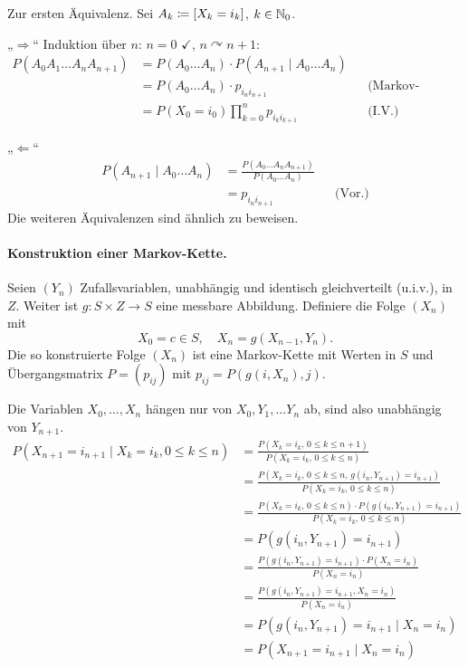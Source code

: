 \documentclass[a4paper,twoside,DIV15,BCOR12mm]{scrbook}
\begin{document}
\begin{beweis}
Zur ersten Äquivalenz. Sei $A_k \da [X_k=i_k]$, $k\in\mathbb{N}_0$.

„$\Longrightarrow$“ Induktion über $n$: $n=0$ $\checkmark$, $n\curvearrowright n+1:$ 
\begin{align*}
P(A_0A_1\ldots A_nA_{n+1}) &= P(A_0\ldots A_n)\cdot P(A_{n+1}\mid A_0\ldots A_n) \\
&= P(A_0\ldots A_n)\cdot p_{i_ni_{n+1}} && \text{(Markov-Eigenschaft)}\\
&= P(X_0=i_0)\prod_{k=0}^n p_{i_ki_{k+1}} && \text{(I.V.)}
\end{align*}

„$\Longleftarrow$“ 
\begin{align*}
P(A_{n+1}\mid A_0\ldots A_n) &= \frac{P(A_0\ldots A_nA_{n+1})}{P(A_0\ldots A_n)} \\
&= p_{i_ni_{n+1}} && \text{(Vor.)}
\end{align*}
Die weiteren Äquivalenzen sind ähnlich zu beweisen.
\end{beweis}

\paragraph{Konstruktion einer Markov-Kette.} Seien $(Y_n)$ Zufallsvariablen, unabhängig und identisch gleichverteilt (u.i.v.), in $Z$. Weiter ist $g:S\times Z\to S$ eine messbare Abbildung. Definiere die Folge $(X_n)$ mit 
\[X_0=c\in S, \quad X_n = g(X_{n-1},Y_n).\]
Die so konstruierte Folge $(X_n)$ ist eine Markov-Kette mit Werten in $S$ und Übergangsmatrix $P=(p_{ij})$ mit $p_{ij} = P(g(i,X_n),j)$.

\begin{beweis}
Die Variablen $X_0,\ldots,X_n$ hängen nur von $X_0,Y_1,\ldots Y_n$ ab, sind also unabhängig von $Y_{n+1}$.
\begin{align*}
P(X_{n+1} = i_{n+1} \mid X_k = i_k, 0\le k\le n) 
&= \frac{P(X_k = i_k,\, 0\le k\le n+1)}{P(X_k = i_k,\, 0\le k\le n)} \\
&= \frac{P(X_k = i_k,\, 0\le k\le n,\, g(i_n,Y_{n+1})=i_{n+1})}{P(X_k = i_k,\, 0\le k\le n)} \\
&= \frac{P(X_k = i_k,\, 0\le k\le n)\cdot P(g(i_n,Y_{n+1})=i_{n+1})}{P(X_k = i_k,\, 0\le k\le n)} \\
&= P(g(i_n,Y_{n+1})=i_{n+1}) \\
&= \frac{P(g(i_n,Y_{n+1})=i_{n+1})\cdot P(X_n=i_n)}{P(X_n =i_n)} \\
&= \frac{P(g(i_n,Y_{n+1})=i_{n+1}, X_n=i_n)}{P(X_n =i_n)} \\
&= P(g(i_n,Y_{n+1})=i_{n+1}\mid X_n=i_n) \\
&= P(X_{n+1} = i_{n+1} \mid X_n=i_n)
\end{align*}
\end{beweis}
\end{document}
